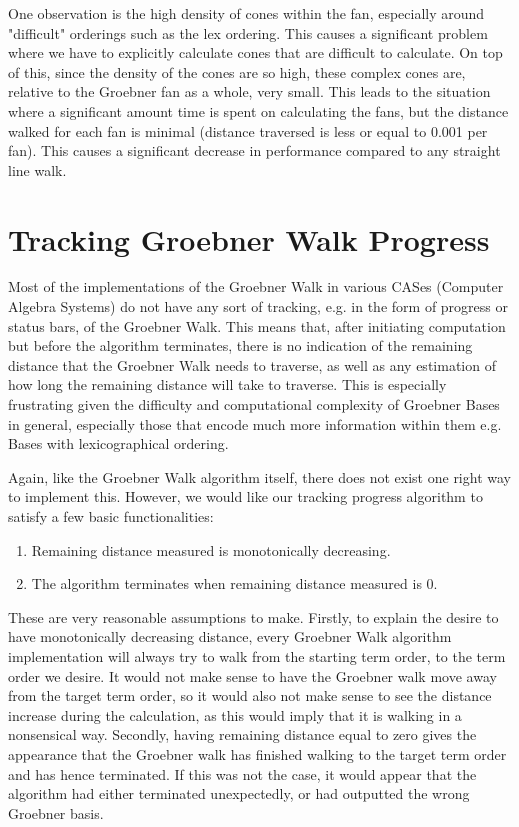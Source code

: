 \documentclass[12pt,a4paper]{report}
\begin{document}
One observation is the high density of cones within the fan, especially around "difficult" orderings such as the lex ordering. This causes a significant problem where we have to explicitly calculate cones that are difficult to calculate. On top of this, since the density of the cones are so high, these complex cones are, relative to the Groebner fan as a whole, very small. This leads to the situation where a significant amount time is spent on calculating the fans, but the distance walked for each fan is minimal (distance traversed is less or equal to 0.001 per fan). This causes a significant decrease in performance compared to any straight line walk.

\chapter{Tracking Groebner Walk Progress}
Most of the implementations of the Groebner Walk in various CASes (Computer Algebra Systems) do not have any sort of tracking, e.g. in the form of progress or status bars, of the Groebner Walk. This means that, after initiating computation but before the algorithm terminates, there is no indication of the remaining distance that the Groebner Walk needs to traverse, as well as any estimation of how long the remaining distance will take to traverse. This is especially frustrating given the difficulty and computational complexity of Groebner Bases in general, especially those that encode much more information within them e.g. Bases with lexicographical ordering.

Again, like the Groebner Walk algorithm itself, there does not exist one right way to implement this. However, we would like our tracking progress algorithm to satisfy a few basic functionalities:

\begin{enumerate}
    \item Remaining distance measured is  monotonically decreasing.
    \item The algorithm terminates when remaining distance measured is 0.
\end{enumerate}

These are very reasonable assumptions to make. Firstly, to explain the desire to have monotonically decreasing distance, every Groebner Walk algorithm implementation will always try to walk from the starting term order, to the term order we desire. It would not make sense to have the Groebner walk move away from the target term order, so it would also not make sense to see the distance increase during the calculation, as this would imply that it is walking in a nonsensical way. Secondly, having remaining distance equal to zero gives the appearance that the Groebner walk has finished walking to the target term order and has hence terminated. If this was not the case, it would appear that the algorithm had either terminated unexpectedly, or had outputted the wrong Groebner basis.
\end{document}
